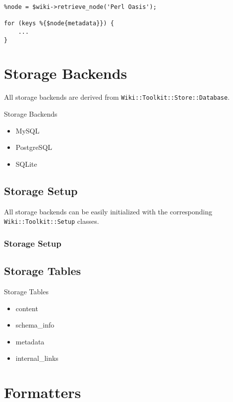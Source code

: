 \begin{lstlisting}
%node = $wiki->retrieve_node('Perl Oasis');

for (keys %{$node{metadata}}) {
    ...
}
\end{lstlisting}

\section{Storage Backends}

All storage backends are derived from \verb+Wiki::Toolkit::Store::Database+.

\begin{frame}{Storage Backends}
 \begin{itemize}
  \item MySQL
  \item PostgreSQL
  \item SQLite
 \end{itemize}
\end{frame}

\subsection{Storage Setup}


All storage backends can be easily initialized with the corresponding
\verb+Wiki::Toolkit::Setup+ classes.

\begin{frame}[fragile]
\frametitle{Storage Setup}

\end{frame}

\subsection{Storage Tables}

\begin{frame}{Storage Tables}
 \begin{itemize}
  \item content
  \item schema\_info
  \item metadata
  \item internal\_links
 \end{itemize}
\end{frame}

\section{Formatters}

